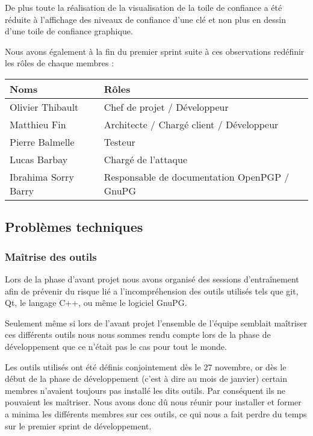 \documentclass{../res/univ-projet}
\begin{document}
    De plus toute la réalisation de la visualisation de la toile de confiance a été réduite
    à l'affichage des niveaux de confiance d'une clé et non plus en dessin d'une toile de confiance graphique.

    Nous avons également à la fin du premier sprint suite à ces observations redéfinir les rôles de chaque membres : 

    \begin{tabular}{|l|l|}
      \hline
      \bfseries{Noms}      & \bfseries{Rôles}                             \\
      \hline
      Olivier Thibault     & Chef de projet / Développeur                 \\
      Matthieu Fin         & Architecte / Chargé client / Développeur     \\
      Pierre Balmelle      & Testeur                                      \\
      Lucas Barbay         & Chargé de l'attaque                          \\
      Ibrahima Sorry Barry & Responsable de documentation OpenPGP / GnuPG \\
      \hline

    \end{tabular}

    
  \subsection{Problèmes techniques}

    \subsubsection{Maîtrise des outils}

      Lors de la phase d'avant projet nous avons organisé des sessions d’entraînement afin
      de prévenir du risque lié a l’incompréhension des outils utilisés tels que git, Qt, le langage C++,
      ou même le logiciel GnuPG.

      Seulement même si lors de l'avant projet l'ensemble de l'équipe semblait maîtriser ces
      différents outils nous nous sommes rendu compte lors de la phase de développement que ce n'était pas le cas
      pour tout le monde.

      Les outils utilisés ont été définis conjointement dès le 27 novembre, or dès le début de la phase de développement
      (c'est à dire au mois de janvier) certain membres n'avaient toujours pas installé les dits outils. Par conséquent
      ils ne pouvaient les maîtriser. Nous avons donc dû nous réunir pour installer et former a minima les différents membres
      sur ces outils, ce qui nous a fait perdre du temps sur le premier sprint de développement.
\end{document}
